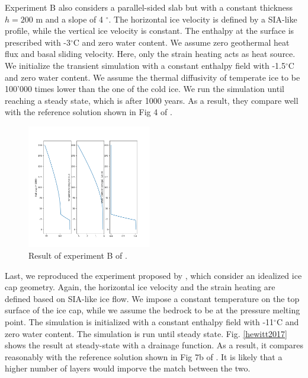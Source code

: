 \documentclass[10pt,twocolumn]{article}
\begin{document}
Experiment B also considers a parallel-sided slab but with a constant thickness $h=200$ m
and a slope of 4 $^{\circ}$. The horizontal ice velocity is defined by a SIA-like profile, 
while the vertical ice velocity is constant. 
The enthalpy at the surface is prescribed with -3$^{\circ}$C and zero water content.
We assume zero geothermal heat flux and basal sliding velocity.
Here, only the strain heating acts as heat source. We initialize 
the transient simulation with a constant enthalpy field with -1.5$^{\circ}$C 
and zero water content. We assume the thermal diffusivity of temperate ice to be 
100'000 times lower than the one of the cold ice. We run the simulation until
reaching a steady state, which is after 1000 years.
As a result, they compare well with 
the reference solution shown in Fig 4 of \citep{kleiner2015enthalpy}. 

\begin{figure}[!h]
\begin{center} 
\includegraphics[width=0.48\textwidth]{fig/KleinerExpB.png}   
\end{center}
\caption{ Result of experiment B of \citep{kleiner2015enthalpy}. \label{KleinerExpB}}
\end{figure}

Last, we reproduced the experiment proposed by \citet{hewitt2017models},
which consider an idealized ice cap geometry. Again, the horizontal ice velocity 
and the strain heating are defined based on SIA-like ice flow. We impose 
a constant temperature on the top surface of the ice cap, while we assume 
the bedrock to be at the pressure melting point. The simulation is initialized 
with a constant enthalpy field  with -11$^{\circ}$C and zero water content.
The simulation is run until steady state.
Fig. \eqref{hewitt2017} shows the result at steady-state with a drainage function.
As a result, it compares reasonably with the reference solution shown in Fig 7b 
of \citep{hewitt2017models}. It is likely that a higher number of layers would
imporve the match between the two.
\end{document}
